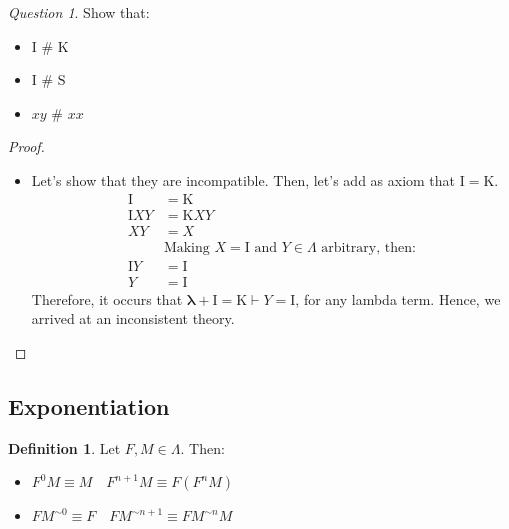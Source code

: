 \documentclass[11pt]{article}
\theoremstyle{definition}
\newtheorem{definition}{Definition}[section]
\theoremstyle{remark}
\theoremstyle{remark}
\newtheorem{question}{Question}
\theoremstyle{definition}
\newcommand{\dneq}{\,\, \# \,\,}
\renewcommand{\S}{\pmb{\mathrm{S}}}
\newcommand{\I}{\pmb{\mathrm{I}}}
\newcommand{\K}{\pmb{\mathrm{K}}}
\begin{document}
\begin{question}
  Show that:
  \begin{itemize}
    \item $\I \dneq \K$
    \item $\I \dneq \S$
    \item $xy \dneq xx$
  \end{itemize}

  \begin{proof}
    \begin{itemize}
      \item Let's show that they are incompatible. Then, let's add as axiom that
            $\I = \K$.
            \begin{align*}
              \I &= \K \\
              \I XY &= \K XY \\
              XY &= X \\
                 &\text{Making } X = \I \text{ and } Y
                   \in \Lambda \text{ arbitrary, then:} \\
              \I Y &= \I \\
              Y &= \I
            \end{align*}
            Therefore, it occurs that $\pmb{\lambda} + \I = \K \vdash Y = \I$,
            for any lambda term. Hence, we arrived at an inconsistent theory.
    \end{itemize}
  \end{proof}
\end{question}

\subsection{Exponentiation}
\begin{definition}
  Let $F, M \in \Lambda$. Then:
  \begin{itemize}
    \item $F^0M \equiv M \quad F^{n+1}M \equiv F(F^nM)$
    \item $FM^{\sim 0} \equiv F \quad FM^{\sim n + 1} \equiv FM^{\sim n}M $
  \end{itemize}
\end{definition}
\end{document}
